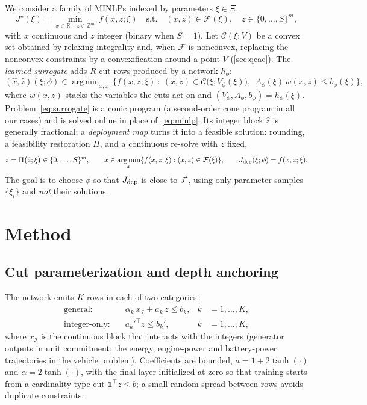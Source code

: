 \documentclass[10pt]{article}
\newcommand{\R}{\mathbb{R}}
\newcommand{\Z}{\mathbb{Z}}
\DeclareMathOperator*{\argmin}{arg\,min}
\begin{document}
We consider a family of MINLPs indexed by parameters $\xi\in\Xi$,
\begin{equation}
\label{eq:minlp}
J^\star(\xi)=\min_{x\in\R^{n},\,z\in\Z^{m}}\ f(x,z;\xi)\quad\text{s.t.}\quad (x,z)\in\mathcal F(\xi),\quad z\in\{0,\dots,S\}^m,
\end{equation}
with $x$ continuous and $z$ integer (binary when $S=1$).
Let $\mathcal C(\xi;V)$ be a convex set obtained by relaxing integrality and, when $\mathcal F$ is nonconvex, replacing the nonconvex constraints by a convexification around a point $V$ (\cref{sec:qcac}).
The \emph{learned surrogate} adds $R$ cut rows produced by a network $h_\phi$:
\begin{equation}
\label{eq:surrogate}
(\hat x,\hat z)(\xi;\phi)\in\argmin_{x,z}\ \Big\{ f(x,z;\xi)\ :\ (x,z)\in\mathcal C\big(\xi;V_\phi(\xi)\big),\ \ A_\phi(\xi)\,w(x,z)\le b_\phi(\xi)\Big\},
\end{equation}
where $w(x,z)$ stacks the variables the cuts act on and $(V_\phi,A_\phi,b_\phi)=h_\phi(\xi)$.
Problem~\eqref{eq:surrogate} is a conic program (a second-order cone program in all our cases) and is solved online in place of~\eqref{eq:minlp}.
Its integer block $\hat z$ is generally fractional; a \emph{deployment map} turns it into a feasible solution: rounding, a feasibility restoration $\Pi$, and a continuous re-solve with $z$ fixed,
\begin{equation}
\label{eq:deploy}
\bar z=\Pi\big(\hat z;\xi\big)\in\{0,\dots,S\}^m,\qquad \bar x\in\argmin_x\{f(x,\bar z;\xi):(x,\bar z)\in\mathcal F(\xi)\},\qquad J_{\rm dep}(\xi;\phi)=f(\bar x,\bar z;\xi).
\end{equation}
The goal is to choose $\phi$ so that $J_{\rm dep}$ is close to $J^\star$, using only parameter samples $\{\xi_i\}$ and \emph{not} their solutions.

\section{Method}
\label{sec:method}

\subsection{Cut parameterization and depth anchoring}
\label{sec:cuts}
The network emits $K$ rows in each of two categories:
\begin{align}
\text{general:}\quad & \alpha_k^\top x_{\mathcal I}+a_k^\top z \le b_k, & k&=1,\dots,K, \label{eq:cut-gen}\\
\text{integer-only:}\quad & a_k'^{\top} z \le b_k', & k&=1,\dots,K, \label{eq:cut-int}
\end{align}
where $x_{\mathcal I}$ is the continuous block that interacts with the integers (generator outputs in unit commitment; the energy, engine-power and battery-power trajectories in the vehicle problem).
Coefficients are bounded, $a=1+2\tanh(\cdot)$ and $\alpha=2\tanh(\cdot)$, with the final layer initialized at zero so that training starts from a cardinality-type cut $\mathbf 1^\top z\le b$; a small random spread between rows avoids duplicate constraints.
\end{document}
